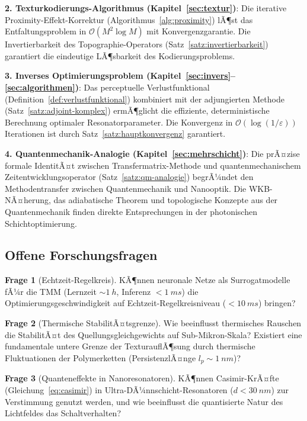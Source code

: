 ﻿\documentclass[a4paper,12pt]{article}
\theoremstyle{definition}
\newtheorem{frage}{Frage}[section]
\newcommand{\ordre}[1]{\mathcal{O}\!\left(#1\right)}
\begin{document}
	\textbf{2. Texturkodierungs-Algorithmus (Kapitel~\ref{sec:textur})}:
	Die iterative Proximity-Effekt-Korrektur (Algorithmus~\ref{alg:proximity})
	lÃ¶st das Entfaltungsproblem in $\ordre{M^2\log M}$ mit Konvergenzgarantie.
	Die Invertierbarkeit des Topographie-Operators (Satz~\ref{satz:invertierbarkeit})
	garantiert die eindeutige LÃ¶sbarkeit des Kodierungsproblems.
	
	\textbf{3. Inverses Optimierungsproblem (Kapitel~\ref{sec:invers}--\ref{sec:algorithmen})}:
	Das perceptuelle Verlustfunktional (Definition~\ref{def:verlustfunktional})
	kombiniert mit der adjungierten Methode (Satz~\ref{satz:adjoint-komplex})
	ermÃ¶glicht die effiziente, deterministische Berechnung optimaler Resonatorparameter.
	Die Konvergenz in $\ordre{\log(1/\varepsilon)}$ Iterationen ist durch
	Satz~\ref{satz:hauptkonvergenz} garantiert.
	
	\textbf{4. Quantenmechanik-Analogie (Kapitel~\ref{sec:mehrschicht})}:
	Die prÃ¤zise formale IdentitÃ¤t zwischen Transfermatrix-Methode und
	quantenmechanischem Zeitentwicklungsoperator (Satz~\ref{satz:qm-analogie})
	begrÃ¼ndet den Methodentransfer zwischen Quantenmechanik und Nanooptik.
	Die WKB-NÃ¤herung, das adiabatische Theorem und topologische Konzepte
	aus der Quantenmechanik finden direkte Entsprechungen in der photonischen
	Schichtoptimierung.
	
	\subsection{Offene Forschungsfragen}
	
	\begin{frage}[Echtzeit-Regelkreis]
		KÃ¶nnen neuronale Netze als Surrogatmodelle fÃ¼r die TMM
		(Lernzeit $\sim \SI{1}{h}$, Inferenz $< \SI{1}{ms}$)
		die Optimierungsgeschwindigkeit auf Echtzeit-Regelkreisniveau
		($< \SI{10}{ms}$) bringen?
	\end{frage}
	
	\begin{frage}[Thermische StabilitÃ¤tsgrenze]
		Wie beeinflusst thermisches Rauschen die StabilitÃ¤t des
		Quellungsgleichgewichts auf Sub-Mikron-Skala?
		Existiert eine fundamentale untere Grenze der TexturauflÃ¶sung
		durch thermische Fluktuationen der Polymerketten
		(PersistenzlÃ¤nge $l_p \sim \SI{1}{nm}$)?
	\end{frage}
	
	\begin{frage}[Quanteneffekte in Nanoresonatoren]
		KÃ¶nnen Casimir-KrÃ¤fte (Gleichung~\eqref{eq:casimir}) in
		Ultra-DÃ¼nnschicht-Resonatoren ($d < \SI{30}{nm}$) zur
		Verstimmung genutzt werden, und wie beeinflusst die
		quantisierte Natur des Lichtfeldes das Schaltverhalten?
	\end{frage}
	
\end{document}
